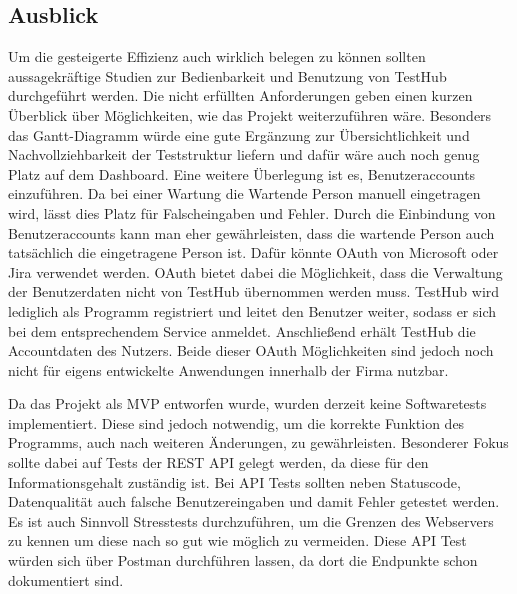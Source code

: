 \subsection{Ausblick}
Um die gesteigerte Effizienz auch wirklich belegen zu können sollten aussagekräftige
Studien zur Bedienbarkeit und Benutzung von TestHub durchgeführt werden.
Die nicht erfüllten Anforderungen geben einen kurzen Überblick über Möglichkeiten,
wie das Projekt weiterzuführen wäre. Besonders das Gantt-Diagramm würde eine gute Ergänzung
zur Übersichtlichkeit und Nachvollziehbarkeit der Teststruktur liefern und dafür
wäre auch noch genug Platz auf dem Dashboard.
Eine weitere Überlegung ist es, Benutzeraccounts einzuführen. Da bei einer Wartung
die Wartende Person manuell eingetragen wird, lässt dies Platz für Falscheingaben und Fehler. 
Durch die Einbindung von Benutzeraccounts kann man eher gewährleisten, dass die 
wartende Person auch tatsächlich die eingetragene Person ist. Dafür könnte OAuth
von Microsoft oder \gls{Jira} verwendet werden. OAuth bietet dabei die Möglichkeit, dass
die Verwaltung der Benutzerdaten nicht von TestHub übernommen werden muss. TestHub
wird lediglich als Programm registriert und leitet den Benutzer weiter, sodass er sich
bei dem entsprechendem Service anmeldet. Anschließend erhält TestHub die Accountdaten
des Nutzers. Beide dieser OAuth Möglichkeiten sind jedoch noch nicht für eigens entwickelte 
Anwendungen innerhalb der Firma nutzbar.

Da das Projekt als \gls{MVP} entworfen wurde, wurden derzeit keine Softwaretests
implementiert. Diese sind jedoch notwendig, um die korrekte Funktion des
Programms, auch nach weiteren Änderungen, zu gewährleisten. Besonderer Fokus sollte dabei
auf Tests der \gls{REST} \gls{API} gelegt werden, da diese für den Informationsgehalt 
zuständig ist. Bei \gls{API} Tests sollten neben Statuscode, Datenqualität auch 
falsche Benutzereingaben und damit Fehler getestet werden. Es ist auch Sinnvoll
Stresstests durchzuführen, um die Grenzen des Webservers zu kennen um diese nach 
so gut wie möglich zu vermeiden. Diese \gls{API} Test würden sich über Postman
durchführen lassen, da dort die Endpunkte schon dokumentiert sind.